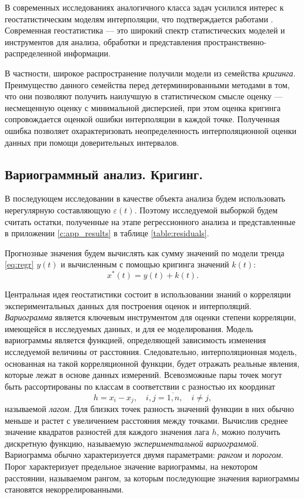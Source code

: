 В современных исследованиях аналогичного класса задач усилился интерес к геостатистическим моделям интерполяции, что подтверждается работами \cite{GeoStCompar1987, GeoStCompar1998}. Современная геостатистика --- это широкий спектр статистических моделей и инструментов для анализа, обработки и представления пространственно-распределенной информации.

В частности, широкое распространение получили модели из семейства \textit{кригинга}. Преимущество данного семейства перед детерминированными методами в том, что они позволяют получить наилучшую в статистическом смысле оценку  --- несмещенную оценку с минимальной дисперсией, при этом оценка кригинга сопровождается оценкой ошибки интерполяции в каждой точке. Полученная ошибка позволяет охарактеризовать неопределенность интерполяционной оценки данных при помощи доверительных интервалов.

\subsection{Вариограммный анализ. Кригинг.} %
\label{sec:_variogram}
В последующем исследовании в качестве объекта анализа будем использовать нерегулярную составляющую $ \varepsilon(t) $. Поэтому исследуемой выборкой будем считать остатки, полученные на этапе регрессионного анализа и представленные в приложении \ref{c:app_results} в таблице \ref{table:residuals}.

Прогнозные значения будем вычислять как сумму значений по модели тренда \eqref{eq:regr} $ y(t) $ и вычисленным с помощью кригинга значений $ k(t) $:
\begin{equation*}
	x^{*}(t) = y(t) + k(t).
\end{equation*}

Центральная идея геостатистики состоит в использовании знаний о корреляции экспериментальных данных для построения оценок и интерполяций. \textit{Вариограмма} является ключевым инструментом для оценки степени корреляции, имеющейся в исследуемых данных, и для ее моделирования. Модель вариограммы является функцией, определяющей зависимость изменения исследуемой величины от расстояния. Следовательно, интерполяционная модель, основанная на такой корреляционной функции, будет отражать реальные явления, которые лежат в основе данных измерений. Всевозможные пары точек могут быть рассортированы по классам в соответствии с разностью их координат
\begin{equation*}
	h = x_i - x_j, \quad i, j = \overline{1,n}, \quad i \neq j,
\end{equation*}
называемой \textit{лагом}. Для близких точек разность значений функции в них обычно меньше и растет с увеличением расстояния между точками. Вычислив среднее значение квадратов разностей для каждого значения лага $h$, можно получить дискретную функцию, называемую \textit{экспериментальной вариограммой}. Вариограмма обычно характеризуется двумя параметрами: \textit{рангом} и \textit{порогом}. Порог характеризует предельное значение вариограммы, на некотором расстоянии, называемом рангом, за которым последующие значения вариограммы становятся некоррелированными.

